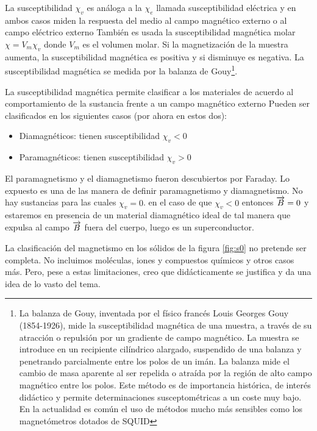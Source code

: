 La susceptibilidad $\chi_{v}$ es análoga a la $\chi_{e}$ llamada susceptibilidad eléctrica y en ambos casos miden la respuesta del medio al campo magnético externo o al campo eléctrico externo También es usada la susceptibilidad magnética molar $\chi=V_{m}\chi_{v}$ donde $V_{m}$ es el volumen molar. Si la magnetización de la muestra aumenta, la susceptibilidad magnética es positiva y si disminuye es negativa. La susceptibilidad magnética se medida por la balanza de Gouy\footnote{La balanza de Gouy, inventada por el físico francés Louis Georges Gouy (1854-1926), mide la susceptibilidad magnética de una muestra, a través de su atracción o repulsión por un gradiente de campo magnético. La muestra se introduce en un recipiente cilíndrico alargado, suspendido de una balanza y penetrando parcialmente entre los polos de un imán. La balanza mide el cambio de masa aparente al ser repelida o atraída por la región de alto campo magnético entre los polos. Este método es de importancia histórica, de interés didáctico y permite determinaciones susceptométricas a un coste muy bajo. En la actualidad es común el uso de métodos mucho más sensibles como los magnetómetros dotados de SQUID}.

La susceptibilidad magnética permite clasificar a los materiales de acuerdo al comportamiento de la sustancia frente a un campo magnético externo Pueden ser clasificados en los siguientes casos (por ahora en estos dos): 

\begin{itemize}
\item Diamagnéticos: tienen susceptibilidad $\chi_{v}<0$

\item Paramagnéticos: tienen susceptibilidad  $\chi_{v}>0$
\end{itemize}

El paramagnetismo y el diamagnetismo fueron descubiertos por Faraday. Lo expuesto es una de las manera de definir paramagnetismo y diamagnetismo. No hay sustancias para las cuales  $\chi_{v}=0$. en el caso de que  $\chi_{v}<0$ entonces  $\overrightarrow{B}=0$ y estaremos en presencia de un {\color{red} material diamagnético ideal} de tal manera que expulsa
al campo $\overrightarrow{B}$ fuera del cuerpo, luego es un superconductor.

La clasificación del magnetismo en los sólidos de la figura \ref{fig:s0} no pretende ser completa. No incluimos moléculas, iones y compuestos químicos y otros casos más. Pero, pese a estas limitaciones, creo que didácticamente se justifica y da una idea de lo vasto del tema.

